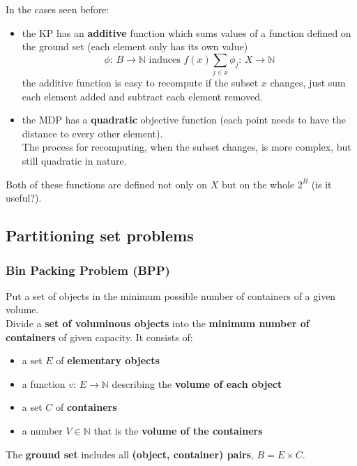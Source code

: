 In the cases seen before: 
\begin{itemize}
	\item the KP has an \textbf{additive} function which sums values of a function defined on the ground set (each element only has its own value)
	$$ \phi : \, B \rightarrow \mathbb{N} \text{ induces } f(x) \sum_{j \in x} \phi_j : \, X \rightarrow \mathbb{N} $$
	the additive function is easy to recompute if the subset $x$ changes, just sum each element added and subtract each element removed.\\
	
	\item the MDP has a \textbf{quadratic} objective function (each point needs to have the distance to every other element). \\
	The process for recomputing, when the subset changes, is more complex, but still quadratic in nature.\\
\end{itemize}
Both of these functions are defined not only on $X$ but on the whole $2^B$ (is it useful?).\\

\newpage

\subsection{Partitioning set problems}
\subsubsection{Bin Packing Problem (BPP)}
Put a set of objects in the minimum possible number of containers of a given volume.\\ 
Divide a \textbf{set of voluminous objects} into the \textbf{minimum number of containers} of given capacity. It consists of:
\begin{itemize}
	\item a set $E$ of \textbf{elementary objects}
	\item a function $v: \, E \rightarrow \mathbb{N}$ describing the \textbf{volume of each object}
	\item a set $C$ of \textbf{containers}
	\item a number $V \in \mathbb{N}$ that is the \textbf{volume of the containers}
\end{itemize}

The \textbf{ground set} includes all \textbf{(object, container) pairs}, $B = E \times C$.\\

